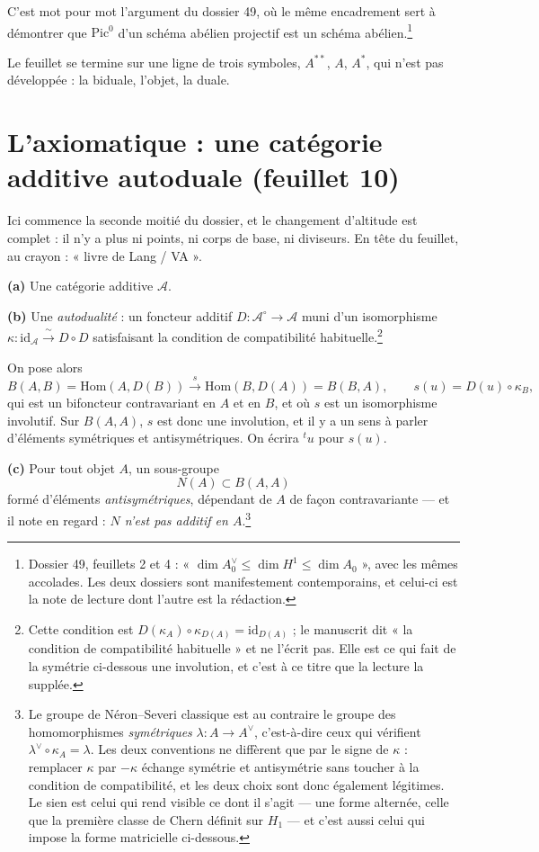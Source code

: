 \documentclass[11pt,a4paper]{article}
\begin{document}
C'est mot pour mot l'argument du dossier 49, où le même encadrement sert à
démontrer que $\mathrm{Pic}^{0}$ d'un schéma abélien projectif est un schéma
abélien.\footnote{Dossier 49, feuillets 2 et 4 : « $\dim A^{\vee}_{0} \leq
\dim H^{1} \leq \dim A_{0}$ », avec les mêmes accolades. Les deux dossiers sont
manifestement contemporains, et celui-ci est la note de lecture dont l'autre
est la rédaction.}

Le feuillet se termine sur une ligne de trois symboles, $A^{**}$, $A$,
$A^{*}$, qui n'est pas développée : la biduale, l'objet, la duale.

\section*{L'axiomatique : une catégorie additive autoduale (feuillet 10)}

Ici commence la seconde moitié du dossier, et le changement d'altitude est
complet : il n'y a plus ni points, ni corps de base, ni diviseurs. En tête du
feuillet, au crayon : « livre de Lang / VA ».

\textbf{(a)} Une catégorie additive $\mathcal{A}$.

\textbf{(b)} Une \emph{autodualité} : un foncteur additif $D : \mathcal{A}^{\circ}
\to \mathcal{A}$ muni d'un isomorphisme $\kappa : \mathrm{id}_{\mathcal{A}}
\xrightarrow{\ \sim\ } D \circ D$ satisfaisant la condition de compatibilité
habituelle.\footnote{Cette condition est $D(\kappa_{A}) \circ \kappa_{D(A)} =
\mathrm{id}_{D(A)}$ ; le manuscrit dit « la condition de compatibilité
habituelle » et ne l'écrit pas. Elle est ce qui fait de la symétrie ci-dessous
une involution, et c'est à ce titre que la lecture la supplée.}

On pose alors
\[
  B(A,B) = \mathrm{Hom}(A, D(B)) \xrightarrow{\ s\ } \mathrm{Hom}(B, D(A))
  = B(B,A),
  \qquad s(u) = D(u) \circ \kappa_{B},
\]
qui est un bifoncteur contravariant en $A$ et en $B$, et où $s$ est un
isomorphisme involutif. Sur $B(A,A)$, $s$ est donc une involution, et il y a un
sens à parler d'éléments symétriques et antisymétriques. On écrira
${}^{t}u$ pour $s(u)$.

\textbf{(c)} Pour tout objet $A$, un sous-groupe
\[
  N(A) \subset B(A,A)
\]
formé d'éléments \emph{antisymétriques}, dépendant de $A$ de façon
contravariante — et il note en regard : \emph{$N$ n'est pas additif en
$A$}.\footnote{Le groupe de Néron--Severi classique est au contraire le groupe
des homomorphismes \emph{symétriques} $\lambda : A \to A^{\vee}$, c'est-à-dire
ceux qui vérifient $\lambda^{\vee} \circ \kappa_{A} = \lambda$. Les deux
conventions ne diffèrent que par le signe de $\kappa$ : remplacer $\kappa$ par
$-\kappa$ échange symétrie et antisymétrie sans toucher à la condition de
compatibilité, et les deux choix sont donc également légitimes. Le sien est
celui qui rend visible ce dont il s'agit — une forme alternée, celle que la
première classe de Chern définit sur $H_{1}$ — et c'est aussi celui qui impose
la forme matricielle ci-dessous.}
\end{document}

